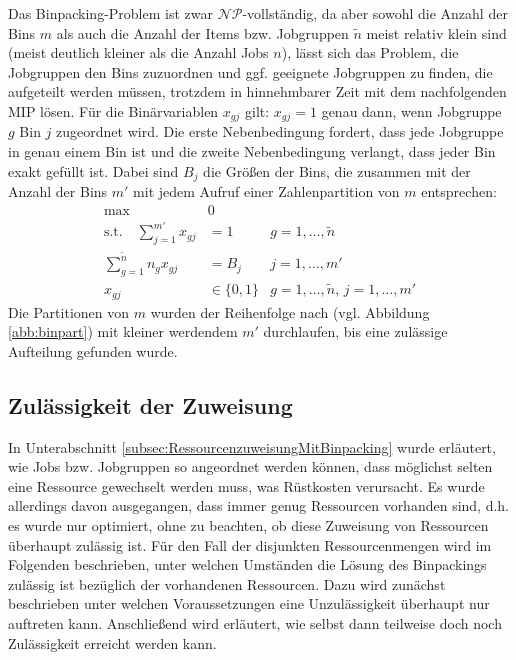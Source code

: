 \documentclass{scrreprt}
\begin{document}
Das Binpacking-Problem ist zwar $\mathcal{NP}$-vollständig, da aber sowohl die Anzahl der Bins $m$ 
als auch die Anzahl der Items bzw. Jobgruppen $\tilde{n}$ meist relativ klein sind (meist deutlich kleiner als die Anzahl Jobs $n$),
lässt sich das Problem, die Jobgruppen den Bins zuzuordnen und ggf. geeignete Jobgruppen zu finden, die aufgeteilt werden müssen, 
trotzdem in hinnehmbarer Zeit mit dem nachfolgenden MIP lösen. 
Für die Binärvariablen $x_{gj}$ gilt: $x_{gj}=1$ genau dann, wenn Jobgruppe $g$ Bin $j$ zugeordnet wird.
Die erste Nebenbedingung fordert, dass jede Jobgruppe in genau einem Bin ist 
und die zweite Nebenbedingung verlangt, dass jeder Bin exakt gefüllt ist.
Dabei sind $B_j$ die Größen der Bins, die zusammen mit der Anzahl der Bins $m'$ mit jedem Aufruf einer Zahlenpartition von $m$ entsprechen:
\begin{align}
    \text{max} \quad &0 \\
    \text{s.t.}\quad \sum_{j=1}^{m'} x_{gj} &= 1 &g=1,\ldots,\tilde{n}\\
    \sum_{g=1}^{\tilde{n}} n_g x_{gj} &= B_j &j=1,\ldots,m' \\
    x_{gj} &\in \{0,1\} &g=1,\ldots,\tilde{n}, \, j=1,\ldots,m'
\end{align}
Die Partitionen von $m$ wurden der Reihenfolge nach (vgl. Abbildung \ref{abb:binpart}) mit kleiner werdendem $m'$ durchlaufen,
bis eine zulässige Aufteilung gefunden wurde.


\subsection{Zulässigkeit der Zuweisung}
\label{subsec:ZulaessigkeitDerZuweisung}
In Unterabschnitt \ref{subsec:RessourcenzuweisungMitBinpacking} wurde erläutert, wie Jobs bzw. Jobgruppen so angeordnet werden können,
dass möglichst selten eine Ressource gewechselt werden muss, was Rüstkosten verursacht.
Es wurde allerdings davon ausgegangen, dass immer genug Ressourcen vorhanden sind,
d.h. es wurde nur optimiert, ohne zu beachten, ob diese Zuweisung von Ressourcen überhaupt zulässig ist.
Für den Fall der disjunkten Ressourcenmengen wird im Folgenden beschrieben, unter welchen Umständen die Lösung des Binpackings zulässig ist
bezüglich der vorhandenen Ressourcen.
Dazu wird zunächst beschrieben unter welchen Voraussetzungen eine Unzulässigkeit überhaupt nur auftreten kann.
Anschließend wird erläutert, wie selbst dann teilweise doch noch Zulässigkeit erreicht werden kann.
\end{document}
